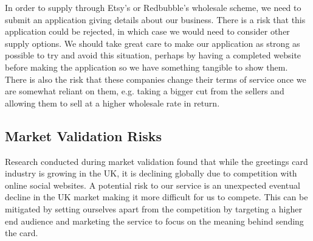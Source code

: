 \documentclass[10pt, a4paper]{article}
\begin{document}
In order to supply through Etsy's or Redbubble's wholesale scheme, we need to submit an application giving details about our business. There is a risk that this application could be rejected, in which case we would need to consider other supply options. We should take great care to make our application as strong as possible to try and avoid this situation, perhaps by having a completed website before making the application so we have something tangible to show them. There is also the risk that these companies change their terms of service once we are somewhat reliant on them, e.g. taking a bigger cut from the sellers and allowing them to sell at a higher wholesale rate in return.

\subsection*{Market Validation Risks}
Research conducted during market validation found that while the greetings card industry is growing in the UK, it is declining globally due to competition with online social websites. A potential risk to our service is an unexpected eventual decline in the UK market making it more difficult for us to compete. This can be mitigated by setting ourselves apart from the competition by targeting a higher end audience and marketing the service to focus on the meaning behind sending the card.










\clearpage
\end{document}
